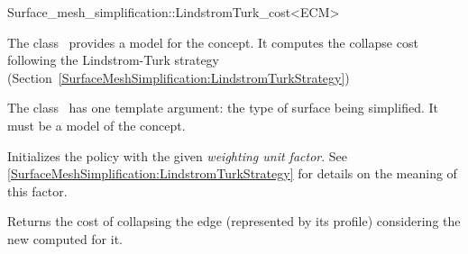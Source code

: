 

\begin{ccRefFunctionObjectClass}{Surface_mesh_simplification::LindstromTurk_cost<ECM>}


\ccDefinition

The class \ccRefName\ provides a model for the  concept.
It computes the collapse cost following the Lindstrom-Turk strategy
(Section~\ref{SurfaceMeshSimplification:LindstromTurkStrategy})

The class \ccRefName\ has one template argument: the type of surface being simplified. 
It must be a model of the  concept.


\ccIsModel
{}

\ccCreation
{}
{Initializes the policy with the given {\em weighting unit factor}.
See \ref{SurfaceMeshSimplification:LindstromTurkStrategy} for details on the meaning of this factor.} 

\ccOperations
{}
  \ccTagFullDeclarations
  {Returns the cost of collapsing the edge (represented by its profile) considering 
  the new  computed for it.}

\ccSeeAlso
{}

\end{ccRefFunctionObjectClass}


